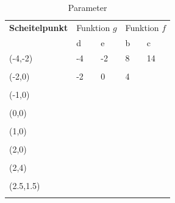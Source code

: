 \documentclass[12pt]{article}
\begin{document}
\begin{table}\scriptsize
\begin{center}
\begin{tabularx}{0.75\linewidth}{|l|X|X|X|X|}
\toprule 
\textbf{Scheitelpunkt} & \multicolumn{2}{c|}{Funktion $g$} & \multicolumn{2}{c|}{Funktion $f$}\\
& d & e & b & c\\
\midrule
(-4,-2) & -4 & -2 & 8 & 14\\
& & & &\\
\hline
(-2,0) & -2 & 0  & 4  & \\
& & & & \\
\hline
(-1,0) & & & &\\
& & & & \\
\hline
(0,0) & & & &\\
& & & & \\
\hline
(1,0) & & & &\\
& & & & \\
\hline
(2,0) & & & &\\
& & & & \\
\hline
(2,4) & & & &\\
& & & & \\
\hline
(2.5,1.5) & & & &\\
& & & & \\
\bottomrule
\end{tabularx}
\caption{Parameter}\label{tab:params}
\end{center}
\end{table}
\newpage
\end{document}
